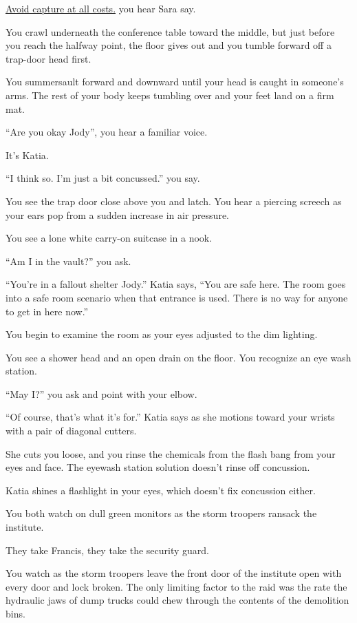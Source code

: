 \documentclass[17pt, twoside, a5paper, openright, extrafontsizes]{memoir}
\renewcommand{\emph}[1]{\ul{#1}}
\begin{document}
\emph{Avoid capture at all costs.} you hear Sara say.

You crawl underneath the conference table toward the middle, but just
before you reach the halfway point, the floor gives out and you tumble
forward off a trap-door head first.

You summersault forward and downward until your head is caught in
someone's arms. The rest of your body keeps tumbling over and your feet
land on a firm mat.

``Are you okay Jody'', you hear a familiar voice.

It's Katia.

``I think so. I'm just a bit concussed.'' you say.

You see the trap door close above you and latch. You hear a piercing
screech as your ears pop from a sudden increase in air pressure.

You see a lone white carry-on suitcase in a nook.

``Am I in the vault?'' you ask.

``You're in a fallout shelter Jody.'' Katia says, ``You are safe here.
The room goes into a safe room scenario when that entrance is used.
There is no way for anyone to get in here now.''

You begin to examine the room as your eyes adjusted to the dim lighting.

You see a shower head and an open drain on the floor. You recognize an
eye wash station.

``May I?'' you ask and point with your elbow.

``Of course, that's what it's for.'' Katia says as she motions toward
your wrists with a pair of diagonal cutters.

She cuts you loose, and you rinse the chemicals from the flash bang from
your eyes and face. The eyewash station solution doesn't rinse off
concussion.

Katia shines a flashlight in your eyes, which doesn't fix concussion
either.

You both watch on dull green monitors as the storm troopers ransack the
institute.

They take Francis, they take the security guard.

You watch as the storm troopers leave the front door of the institute
open with every door and lock broken. The only limiting factor to the
raid was the rate the hydraulic jaws of dump trucks could chew through
the contents of the demolition bins.
\end{document}
